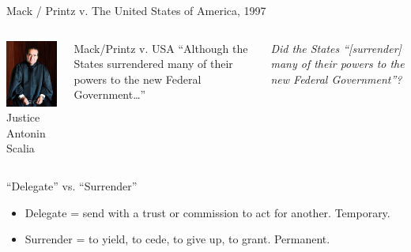 \begin{frame}{Mack / Printz v. The United States of America, 1997}
    \begin{columns}[onlytextwidth]
            \centering
            \includegraphics[height=0.75\textheight]{img/scalia.jpg} \\
            Justice Antonin Scalia \\

            \begin{block}{Mack/Printz v. USA}
                ``Although the States surrendered many of their powers to the new Federal Government\ldots''
            \end{block}
            \pause
            {
                \color{red}
                \emph{Did the States ``[surrender] many of their powers to the new Federal Government''?}
            }
    \end{columns}
\end{frame}


\begin{frame}{``Delegate'' vs. ``Surrender''}
    \begin{itemize}
        \item Delegate = send with a trust or commission to act for another. Temporary.
        \item Surrender = to yield, to cede, to give up, to grant. Permanent.
    \end{itemize}
\end{frame}


